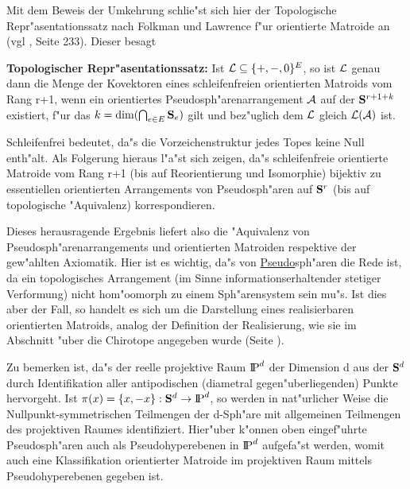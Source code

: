 Mit dem Beweis der Umkehrung schlie"st sich hier der Topologische
Repr"asentationssatz nach Folkman und Lawrence f"ur orientierte Matroide an
(vgl \cite{Bj:93}, Seite 233). Dieser besagt
\begin{satz}
{\bf Topologischer Repr"asentationssatz:} Ist ${\cal L}\subseteq\{+,-,0\}^E$, so
ist $\cal L$ genau dann die Menge der Kovektoren eines schleifenfreien
orientierten Matroids vom Rang r+1, wenn ein orientiertes
Pseudosph"arenarrangement $\cal A$ auf der $\S^{r+1+k}$ existiert, f"ur das
$k=\mbox{dim}(\Cap_{e\in E}\S_e)$ gilt und bez"uglich dem $\cal L$ gleich
$\cal L(A)$ ist.
\end{satz}

Schleifenfrei bedeutet, da"s die Vorzeichenstruktur jedes Topes keine Null
enth"alt. Als Folgerung hieraus l"a"st sich zeigen, da"s schleifenfreie
orientierte Matroide vom Rang r+1 (bis auf Reorientierung und Isomorphie)
bijektiv zu essentiellen orientierten Arrangements von Pseudosph"aren auf
$\S^r$ (bis auf topologische "Aquivalenz) korrespondieren.

Dieses herausragende Ergebnis liefert also die "Aquivalenz von
Pseudosph"arenarrangements und orientierten Matroiden respektive der gew"ahlten
Axiomatik. Hier ist es wichtig, da"s von \ul{Pseu\-do}\-sph"aren die Rede ist,
da ein topologisches Arrangement (im Sinne informationserhaltender stetiger
Verformung) nicht hom"oomorph zu einem Sph"arensystem sein mu"s.
Ist dies aber der Fall, so handelt es sich um die Darstellung eines
realisierbaren orientierten Matroids, analog der Definition der Realisierung,
wie sie im Abschnitt "uber die Chirotope angegeben wurde (Seite \pageref{real}).

Zu bemerken ist, da"s der reelle projektive Raum $\P^d$ der Dimension d aus
der $\S^d$ durch Identifikation aller antipodischen (diametral
gegen"uberliegenden) Punkte hervorgeht. Ist $\pi(x)=\{x,-x\}:\S^d\to \P^d$,
so werden in nat"urlicher Weise die Nullpunkt-symmetrischen Teilmengen
der d-Sph"are mit allgemeinen Teilmengen des projektiven Raumes
identifiziert. Hier"uber k"onnen oben eingef"uhrte Pseudosph"aren auch als
Pseudohyperebenen in $\P^d$ aufgefa"st werden, womit auch eine Klassifikation
orientierter Matroide im projektiven Raum mittels Pseudohyperebenen gegeben ist.


